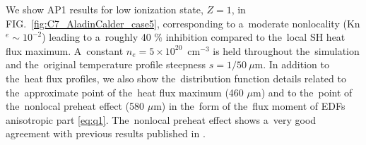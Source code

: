 \documentclass[
 aps,
 jmp,
 amsmath,amssymb,
 twocolumn,
]{revtex4-1}
\newcommand{\figref}[1]{FIG.~\ref{#1}}
\newcommand{\mfpe}{\lambda_e}
\newcommand{\mfpei}{\lambda_{ei}}
\newcommand{\Zbar}{Z}
\newcommand{\vth}{v_{th}}
\newcommand{\ed}{n_e}
\begin{document}
We show AP1 results for low ionization state, $\Zbar = 1$, in \figref{fig:C7_AladinCalder_case5}, corresponding to a~moderate nonlocality 
(Kn$^e \sim 10^{-2}$) leading to a~roughly 40 $\%$ inhibition compared 
to the~local SH heat flux maximum. 
A~constant $\ed = 5\times10^{20}$~cm$^{-3}$ is held throughout the~simulation 
and the~original temperature profile steepness $s = 1/50~\mu$m.
In addition to the~heat flux profiles, we also show the~distribution function 
details related to the~approximate point of the~heat flux maximum (460 $\mu$m) 
and to the~point of the~nonlocal preheat effect (580 $\mu$m) in the~form of
the~flux moment of EDFs anisotropic part \eqref{eq:q1}.
The~nonlocal preheat effect shows a~very good agreement with 
previous results published in \cite{Sherlock_PoP2017}.
\end{document}
